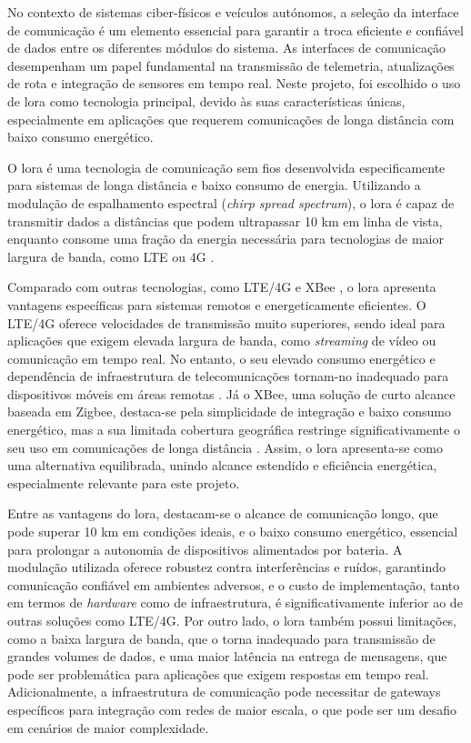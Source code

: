 No contexto de sistemas ciber-físicos e veículos autónomos, a seleção da interface de comunicação é um elemento essencial para garantir a troca eficiente e confiável de dados entre os diferentes módulos do sistema. As interfaces de comunicação desempenham um papel fundamental na transmissão de telemetria, atualizações de rota e integração de sensores em tempo real. Neste projeto, foi escolhido o uso de \gls{lora} como tecnologia principal, devido às suas características únicas, especialmente em aplicações que requerem comunicações de longa distância com baixo consumo energético.

O \gls{lora} é uma tecnologia de comunicação sem fios desenvolvida especificamente para sistemas de longa distância e baixo consumo de energia. Utilizando a modulação de espalhamento espectral (\emph{chirp spread spectrum}), o \gls{lora} é capaz de transmitir dados a distâncias que podem ultrapassar 10 km em linha de vista, enquanto consome uma fração da energia necessária para tecnologias de maior largura de banda, como LTE \cite{wikipedia-lte} ou 4G \cite{wikipedia-4g,bivocom-lte-vs-lora}.  

Comparado com outras tecnologias, como LTE/4G e XBee \cite{digi-xbee}, o \gls{lora} apresenta vantagens específicas para sistemas remotos e energeticamente eficientes. O LTE/4G oferece velocidades de transmissão muito superiores, sendo ideal para aplicações que exigem elevada largura de banda, como \textit{streaming} de vídeo ou comunicação em tempo real. No entanto, o seu elevado consumo energético e dependência de infraestrutura de telecomunicações tornam-no inadequado para dispositivos móveis em áreas remotas \cite{bivocom-lte-vs-lora}. Já o XBee, uma solução de curto alcance baseada em Zigbee, destaca-se pela simplicidade de integração e baixo consumo energético, mas a sua limitada cobertura geográfica restringe significativamente o seu uso em comunicações de longa distância \cite{digi-xbee-specs, xbee-range-comparison}. Assim, o \gls{lora} apresenta-se como uma alternativa equilibrada, unindo alcance estendido e eficiência energética, especialmente relevante para este projeto.

Entre as vantagens do \gls{lora}, destacam-se o alcance de comunicação longo, que pode superar 10 km em condições ideais, e o baixo consumo energético, essencial para prolongar a autonomia de dispositivos alimentados por bateria. A modulação utilizada oferece robustez contra interferências e ruídos, garantindo comunicação confiável em ambientes adversos, e o custo de implementação, tanto em termos de \emph{hardware} como de infraestrutura, é significativamente inferior ao de outras soluções como LTE/4G. Por outro lado, o \gls{lora} também possui limitações, como a baixa largura de banda, que o torna inadequado para transmissão de grandes volumes de dados, e uma maior latência na entrega de mensagens, que pode ser problemática para aplicações que exigem respostas em tempo real. Adicionalmente, a infraestrutura de comunicação pode necessitar de gateways específicos para integração com redes de maior escala, o que pode ser um desafio em cenários de maior complexidade.

